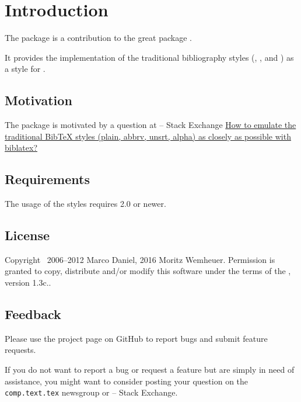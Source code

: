 \documentclass{ltxdockit}[2011/03/25]
\begin{document}
\printtitlepage
\tableofcontents


\section{Introduction}\label{sec:int}

The package  is a contribution to the great package .

It provides the implementation of the traditional bibliography styles (,
,  and ) as a style for .

\subsection{Motivation}\label{subsec:int:mot}

The package is motivated by a question at \tex -- \latex Stack Exchange \glqq \href{http://tex.stackexchange.com/a/69706/}{How to emulate the traditional BibTeX styles (plain, abbrv, unsrt, alpha) as closely as possible with biblatex?}

\subsection{Requirements}

The usage of the styles requires  2.0 or newer.

\subsection{License}

Copyright \textcopyright\ 2006--2012 Marco Daniel, 2016 Moritz Wemheuer. Permission is granted to copy, distribute and\slash or modify this software under the terms of the \lppl, version 1.3c..


\subsection{Feedback}\label{subsec:int:feb}

Please use the  project page on GitHub to report bugs and submit feature requests.

If you do not want to report a bug or request a feature but are simply in need of assistance, you might want to consider posting your question on the \texttt{comp.text.tex} newsgroup or \tex -- \latex Stack Exchange.
\end{document}
